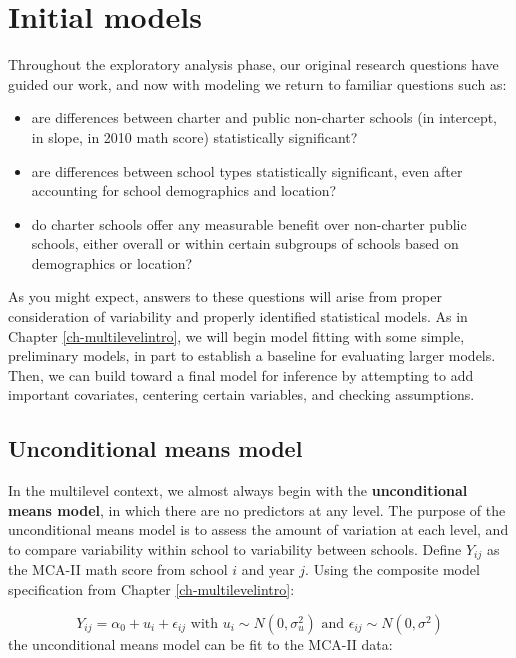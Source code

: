 \documentclass[
]{krantz}
\providecommand{\tightlist}{%
  \setlength{\itemsep}{0pt}\setlength{\parskip}{0pt}}
\begin{document}
\hypertarget{lineartwostageerror}{%
\section{Initial models}\label{lineartwostageerror}}

Throughout the exploratory analysis phase, our original research questions have guided our work, and now with modeling we return to familiar questions such as:

\begin{itemize}
\tightlist
\item
  are differences between charter and public non-charter schools (in intercept, in slope, in 2010 math score) statistically significant?
\item
  are differences between school types statistically significant, even after accounting for school demographics and location?
\item
  do charter schools offer any measurable benefit over non-charter public schools, either overall or within certain subgroups of schools based on demographics or location?
\end{itemize}

As you might expect, answers to these questions will arise from proper consideration of variability and properly identified statistical models.
As in Chapter \ref{ch-multilevelintro}, we will begin model fitting with some simple, preliminary models, in part to establish a baseline for evaluating larger models. Then, we can build toward a final model for inference by attempting to add important covariates, centering certain variables, and checking assumptions.

\hypertarget{modela}{%
\subsection{Unconditional means model}\label{modela}}

In the multilevel context, we almost always begin with the \textbf{unconditional means model},  in which there are no predictors at any level. The purpose of the unconditional means model is to assess the amount of variation at each level, and to compare variability within school to variability between schools. Define \(Y_{ij}\) as the MCA-II math score from school \(i\) and year \(j\). Using the composite model specification from Chapter \ref{ch-multilevelintro}:

\begin{equation*}
Y _{ij} = \alpha_{0} + u_{i} + \epsilon_{ij} \textrm{ with } u_{i} \sim N(0, \sigma^2_u) \textrm{ and } \epsilon_{ij} \sim N(0, \sigma^2)
\end{equation*}
the unconditional means model can be fit to the MCA-II data:
\end{document}
